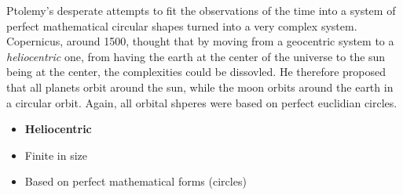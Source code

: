 Ptolemy's desperate attempts to fit the observations of the time into a system of perfect mathematical circular shapes turned into a very complex system. Copernicus, around 1500, thought that by moving from a geocentric system to a \emph{heliocentric} one, from having the earth at the center of the universe to the sun being at the center, the complexities could be dissovled. He therefore proposed that all planets orbit around the sun, while the moon orbits around the earth in a circular orbit. Again, all orbital shperes were based on perfect euclidian circles.

\begin{figure}[h!]
	\centering
\end{figure}

\begin{itemize}
	\item \textbf{Heliocentric}
	\item Finite in size
	\item Based on perfect mathematical forms (circles)
\end{itemize}

\pagebreak


